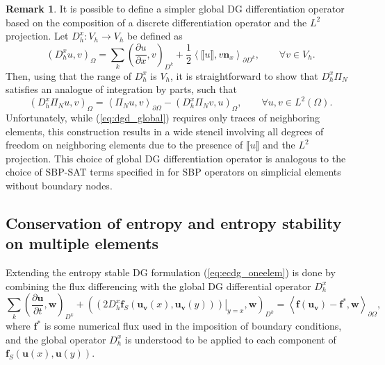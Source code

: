 \documentclass[preprint,10pt]{article}
\theoremstyle{definition}
\theoremstyle{lemma}
\newtheorem*{remark}{Remark}
\theoremstyle{theorem}
\theoremstyle{assumption}
\newcommand{\pd}[2]{\frac{\partial#1}{\partial#2}}
\newcommand{\LRp}[1]{\left( #1 \right)}
\newcommand{\LRa}[1]{\left\langle #1 \right\rangle}
\newcommand{\jump}[1] {\ensuremath{\llbracket#1\rrbracket}}
\renewcommand{\L}{L^2\LRp{\Omega}}
\newcommand{\note}[1]{{\color{blue}{#1}}}
\begin{document}
\begin{remark}
It is possible to define a simpler global DG differentiation operator based on the composition of a discrete differentiation operator and the $L^2$ projection.  Let ${D}^x_h: V_h\rightarrow V_h$ be defined as
\[
\LRp{D^x_h u,v}_{\Omega} = \sum_k \LRp{\pd{u}{x},v}_{D^k} + \frac{1}{2}\LRa{\jump{u},v\bm{n}_x}_{\partial D^k}, \qquad \forall v \in V_h.
\]
Then, using that the range of $D^x_h$ is $V_h$, it is straightforward to show that $D^x_h \Pi_N$ satisfies an analogue of integration by parts, such that
\[
\LRp{D^x_h\Pi_N u, v}_{\Omega} = \LRa{\Pi_N u,v}_{\partial \Omega} - \LRp{D^x_h\Pi_N v, u}_{\Omega}, \qquad \forall u,v\in \L.
\]
Unfortunately, while (\ref{eq:dgd_global}) requires only traces of neighboring elements, this construction results in a wide stencil involving all degrees of freedom on neighboring elements due to the presence of $\jump{u}$ and the $L^2$ projection.  This choice of global DG differentiation operator is analogous to the choice of SBP-SAT terms specified in \cite{fernandez2016simultaneous} for SBP operators on simplicial elements without boundary nodes.  
\end{remark}


\subsection{Conservation of entropy and entropy stability on multiple elements}
\label{sec:multipleelems}
Extending the entropy stable DG formulation (\ref{eq:ecdg_oneelem}) is done by combining the flux differencing with the global DG differential operator $D^x_h$
\begin{equation}
\sum_{k}\LRp{\pd{\bm{u}}{t},\bm{w}}_{D^k} + \LRp{\left.\LRp{2D^x_h\bm{f}_S(\bm{u}_{\bm{v}}(x),\bm{u}_{\bm{v}}(y))}\right|_{y=x},\bm{w}}_{D^k} = \LRa{\bm{f}(\bm{u}_{\bm{v}})-\bm{f}^*,\bm{w}}_{\partial \Omega},
\label{eq:ecdg}
\end{equation}
where $\bm{f}^*$ is some numerical flux used in the imposition of boundary conditions, and the global operator $D^x_h$ is understood to be applied to each component of $\bm{f}_S\LRp{\bm{u}(x),\bm{u}(y)}$.  
\end{document}
